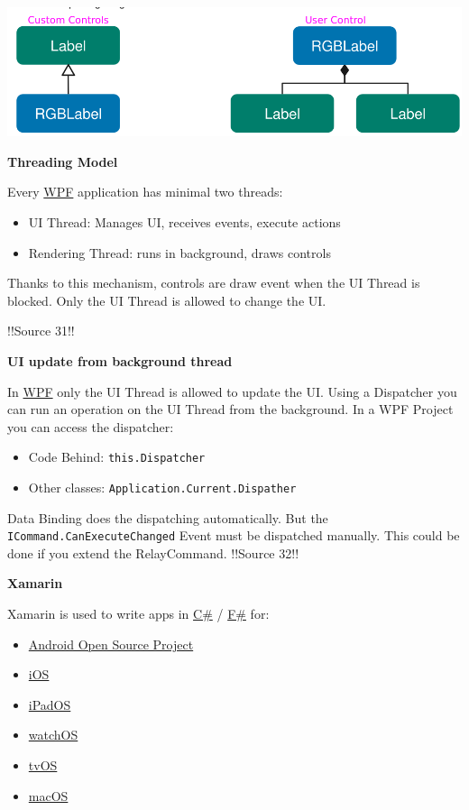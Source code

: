 \documentclass[10pt,twoside,landscape]{article}
\begin{document}
\begin{multicols}{4}
\begin{center}
\includegraphics[width=.9\linewidth]{img/custom_user_control.png}
\end{center}

\textbf{Threading Model}

Every \href{../../../roam/20211123162923-wpf.org}{WPF} application has minimal two threads:
\begin{itemize}
\item UI Thread: Manages UI, receives events, execute actions
\item Rendering Thread: runs in background, draws controls
\end{itemize}


Thanks to this mechanism, controls are draw event when the UI Thread is blocked.
Only the UI Thread is allowed to change the UI.

!!Source 31!!

\textbf{UI update from background thread}

In \href{../../../roam/20211123162923-wpf.org}{WPF} only the UI Thread is allowed to update the UI.
Using a Dispatcher you can run an operation on the UI Thread from the background.
In a WPF Project you can access the dispatcher:
\begin{itemize}
\item Code Behind: \texttt{this.Dispatcher}
\item Other classes: \texttt{Application.Current.Dispather}
\end{itemize}


Data Binding does the dispatching automatically.
But the \texttt{ICommand.CanExecuteChanged} Event must be dispatched manually.
This could be done if you extend the RelayCommand.
!!Source 32!!

\textbf{Xamarin}

Xamarin is used to write apps in \href{../../../roam/20211003114158-c.org}{C\#} / \href{../../../roam/20211003114238-f.org}{F\#} for:
\begin{itemize}
\item \href{../../../roam/20210921143632-aosp.org}{Android Open Source Project}
\item \href{../../../roam/20220103094421-ios.org}{iOS}
\item \href{../../../roam/20220103094441-ipados.org}{iPadOS}
\item \href{../../../roam/20220103094458-watchos.org}{watchOS}
\item \href{../../../roam/20220103094511-tvos.org}{tvOS}
\item \href{../../../roam/20220103094529-macos.org}{macOS}
\end{itemize}



\end{multicols}
\end{document}
